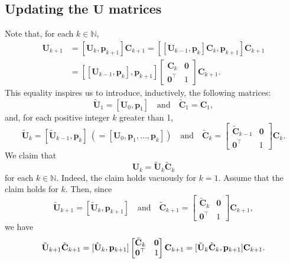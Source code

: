 \documentclass[11pt,a4paper]{article}
\newcommand{\0}{\M{0}}
\newcommand{\M}[1]{\mathbf{#1}}
\newcommand{\Mt}[1]{\tilde{\M{#1}}}
\newcommand{\N}{\mathbb{N}}
\newcommand{\T}{\top}
\newcommand{\ve}[1]{\mathbf{#1}}
\begin{document}
\subsection{Updating the $\M{U}$ matrices}

Note that, for each $k \in \N$, 
\begin{align*}
  \M{U}_{k+1}
  &
    = [\M{U}_k, \ve{p}_{k+1}] \M{C}_{k+1}
    =  [[\M{U}_{k-1}, \ve{p}_k] \M{C}_k, \ve{p}_{k+1}] \M{C}_{k+1}
  \\
  &
    =
    \left[
    [\M{U}_{k-1}, \ve{p}_k], \ve{p}_{k+1}
    \right]
    \begin{bmatrix}
      \M{C}_k & \0
      \\
      \0^\T & 1
    \end{bmatrix}
              \M{C}_{k+1}.
\end{align*}
This equality inspires us to introduce, inductively, the following matrices:
\begin{displaymath}
  \Mt{U}_1 = [\M{U}_0, \ve{p}_1]
  \quad
  \text{and}
  \quad
  \Mt{C}_1 = \M{C}_1,
\end{displaymath}
and, for each positive integer $k$ greater than 1, 
\begin{displaymath}
  \Mt{U}_k
  =
  [ \Mt{U}_{k-1},  \ve{p}_k]
  \
  (
  = 
  [\M{U}_0, \ve{p}_1, \dots, \ve{p}_k]
  )
  \quad
  \text{and}
  \quad
  \Mt{C}_k
  =
  \begin{bmatrix}
    \Mt{C}_{k-1} & \0
    \\
    \0^\T & 1
  \end{bmatrix}
  \M{C}_k.
\end{displaymath}
We claim that
\begin{equation}
  \label{eq:1}
  \M{U}_k = \Mt{U}_k \Mt{C}_k
\end{equation}
for each $k \in \N$.  Indeed, the claim holds vacuously for $k = 1$. Assume that the claim holds for $k$. Then, since
\begin{displaymath}
  \Mt{U}_{k+1} = [\Mt{U}_k, \ve{p}_{k+1}]
  \quad
  \text{and}
  \quad
  \Mt{C}_{k+1}
  =
  \begin{bmatrix}
    \Mt{C}_k & \0
    \\
    \0^\T & 1
  \end{bmatrix}
  \M{C}_{k+1},
\end{displaymath}
we have
\begin{displaymath}
  \Mt{U}_{k+1} \Mt{C}_{k+1}
  =
  [\Mt{U}_k, \ve{p}_{k+1}]
  \begin{bmatrix}
    \Mt{C}_k & \0
    \\
    \0^\T & 1
  \end{bmatrix}
  \M{C}_{k+1}
  \\
  =
  [\Mt{U}_k  \Mt{C}_k, \ve{p}_{k+1}] \M{C}_{k+1}.
\end{displaymath}
\end{document}
